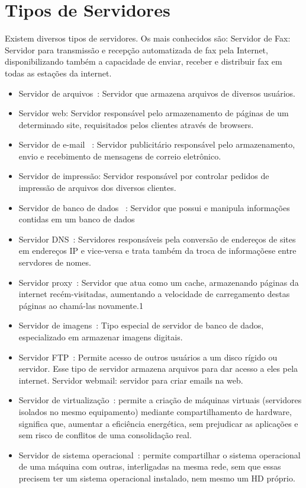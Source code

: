 \section{Tipos de Servidores}
Existem diversos tipos de servidores. Os mais conhecidos são:
Servidor de Fax: Servidor para transmissão e recepção automatizada de fax pela Internet, disponibilizando também a capacidade de enviar, receber e distribuir fax em todas as estações da internet.
\begin{itemize}

\item Servidor de arquivos~\cite{carmona}: Servidor que armazena arquivos de diversos usuários.
\item Servidor web: Servidor responsável pelo armazenamento de páginas de um determinado site, requisitados pelos clientes através de browsers.
\item Servidor de e-mail ~\cite{carmona}: Servidor publicitário responsável pelo armazenamento, envio e recebimento de mensagens de correio eletrônico.
\item Servidor de impressão: Servidor responsável por controlar pedidos de impressão de arquivos dos diversos clientes.
\item Servidor de banco de dados ~\cite{carmona}: Servidor que possui e manipula informações contidas em um banco de dados
\item Servidor DNS~\cite{kirch}: Servidores responsáveis pela conversão de endereços de sites em endereços IP e vice-versa e trata também da troca de informaçõese entre servdores de nomes.
\item Servidor proxy~\cite{carmona}: Servidor que atua como um cache, armazenando páginas da internet recém-visitadas, aumentando a velocidade de carregamento destas páginas ao chamá-las novamente.1
\item Servidor de imagens~\cite{carmona}: Tipo especial de servidor de banco de dados, especializado em armazenar imagens digitais.
\item Servidor FTP~\cite{carmona}: Permite acesso de outros usuários a um disco rígido ou servidor. Esse tipo de servidor armazena arquivos para dar acesso a eles pela internet.
Servidor webmail: servidor para criar emails na web.
\item Servidor de virtualização~\cite{carmona}: permite a criação de máquinas virtuais (servidores isolados no mesmo equipamento) mediante compartilhamento de hardware, significa que, aumentar a eficiência energética, sem prejudicar as aplicações e sem risco de conflitos de uma consolidação real.
\item Servidor de sistema operacional~\cite{carmona}: permite compartilhar o sistema operacional de uma máquina com outras, interligadas na mesma rede, sem que essas precisem ter um sistema operacional instalado, nem mesmo um HD próprio.
\end{itemize}

